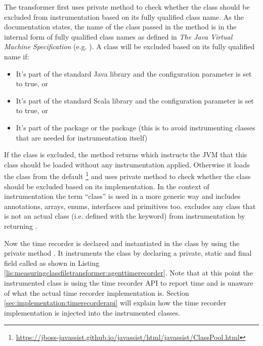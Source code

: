 \noindent The transformer first uses private method  to check whether the class should be excluded from instrumentation based on its fully qualified class name. As the documentation states, the name of the class passed in the method is in the internal form of fully qualified class names as defined in \textit{The Java Virtual Machine Specification} (e.g. ). A class will be excluded based on its fully qualified name if:
\begin{itemize}
  \item It's part of the standard Java library and the  configuration parameter is set to true, or
  \item It's part of the standard Scala library and the  configuration parameter is set to true, or
  \item It's part of the  package or the  package (this is to avoid instrumenting classes that are needed for instrumentation itself)
\end{itemize}

\noindent If the class is excluded, the method returns  which instructs the JVM that this class should be loaded without any instrumentation applied. Otherwise it loads the class from the default \footnote{\url{https://jboss-javassist.github.io/javassist/html/javassist/ClassPool.html}} and uses private method  to check whether the class should be excluded based on its implementation. In the context of instrumentation the term \enquote{class} is used in a more generic way and includes annotations, arrays, enums, interfaces and primitives too.  excludes any class that is not an actual class (i.e. defined with the  keyword) from instrumentation by returning .

\noindent Now the time recorder is declared and instantiated in the class by using the private method . It instruments the class by declaring a private, static and final field called  as shown in Listing \ref{lis:measuringclassfiletransformer:agenttimerecorder}. Note that at this point the instrumented class is using the time recorder API to report time and is unaware of what the actual time recorder implementation is. Section \ref{sec:implementation:timerecorderapi} will explain how the time recorder implementation is injected into the instrumented classes.

